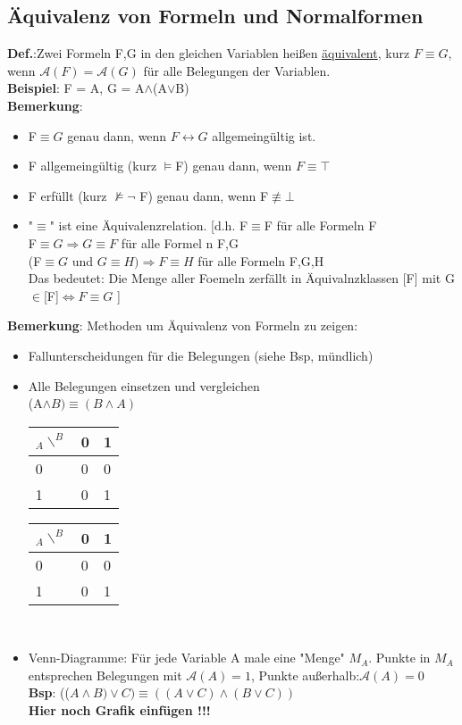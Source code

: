 \documentclass[a4paper]{scrartcl}
\begin{document}
\subsection{Äquivalenz von Formeln und Normalformen}
\textbf{Def.}:Zwei Formeln F,G in den gleichen Variablen heißen \underline{äquivalent}, kurz $F\equiv G$, wenn $\mathcal{A}(F)=\mathcal{A}(G)$ für alle Belegungen der Variablen.\\
\textbf{Beispiel}: F = A, G = A$\land$(A$\lor$B)\\
\textbf{Bemerkung}: \begin{itemize}
\item F$\equiv G$ genau dann, wenn $F\leftrightarrow G$ allgemeingültig ist.\\ 
\item F allgemeingültig (kurz $\models$F) genau dann, wenn $F\equiv \top$\\
\item F erfüllt (kurz $\nvDash \neg $ F) genau dann, wenn F$\not\equiv \bot$\\
\item "$\equiv$" ist eine  Äquivalenzrelation. [d.h. F$\equiv$F für alle Formeln F\\
F$\equiv G \Rightarrow G \equiv F$ für alle Formel n F,G\\
(F$\equiv G $ und $G\equiv H)\Rightarrow F \equiv H$ für alle Formeln F,G,H\\
Das bedeutet: Die Menge aller Foemeln zerfällt in Äquivalnzklassen [F] mit G$\in$[F]$\Leftrightarrow F\equiv G$ ]\\ 
\end{itemize}
\textbf{Bemerkung}: Methoden um Äquivalenz von Formeln zu zeigen:\\
\begin{itemize}
\item Fallunterscheidungen für die Belegungen (siehe Bsp, mündlich)\\
\item Alle Belegungen einsetzen und vergleichen\\
(A$\land B ) \equiv (B\land A)$ \\
\begin{tabular}{l|l|l}
$_A\backslash ^B$ & 0 & 1\\ \hline 0 & 0 & 0\\ \hline 1 & 0 & 1\\\end{tabular}
\begin{tabular}{l|l|l}
$_A\backslash ^B$ & 0 & 1 \\ \hline 0 & 0 & 0 \\ \hline 1 & 0 & 1 \end{tabular}\\
\item Venn-Diagramme: Für jede Variable A male eine "Menge" $M_A$. Punkte in $M_A$ entsprechen Belegungen mit $\mathcal{A}(A)=1$, Punkte außerhalb:$\mathcal{A}(A)=0$\\
\textbf{Bsp}: (($A\land B)\lor C ) \equiv ((A\lor C ) \land (B \lor C))$\\
\textbf{Hier noch Grafik einfügen !!!}\\
\end{itemize}
\end{document}
